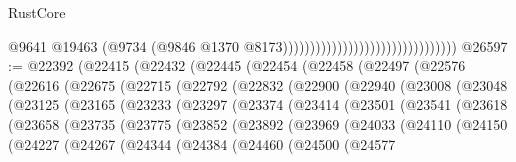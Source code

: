 \begin{lexlean}{RustCore}
\begin{coremodule}
                                                                @9641
                                                                @19463
                                                                (@9734
                                                                  (@9846
                                                                    @1370
                                                                    @8173))))))))))))))))))))))))))))))))
@26597 := @22392
    (@22415
      (@22432
        (@22445
          (@22454
            (@22458
              (@22497
                (@22576
                  (@22616
                    (@22675
                      (@22715
                        (@22792
                          (@22832
                            (@22900
                              (@22940
                                (@23008
                                  (@23048
                                    (@23125
                                      (@23165
                                        (@23233
                                          (@23297
                                            (@23374
                                              (@23414
                                                (@23501
                                                  (@23541
                                                    (@23618
                                                      (@23658
                                                        (@23735
                                                          (@23775
                                                            (@23852
                                                              (@23892
                                                                (@23969
                                                                  (@24033
                                                                    (@24110
                                                                      (@24150
                                                                        (@24227
                                                                          (@24267
                                                                            (@24344
                                                                              (@24384
                                                                                (@24460
                                                                                  (@24500
                                                                                    (@24577

\end{coremodule}
\end{lexlean}
